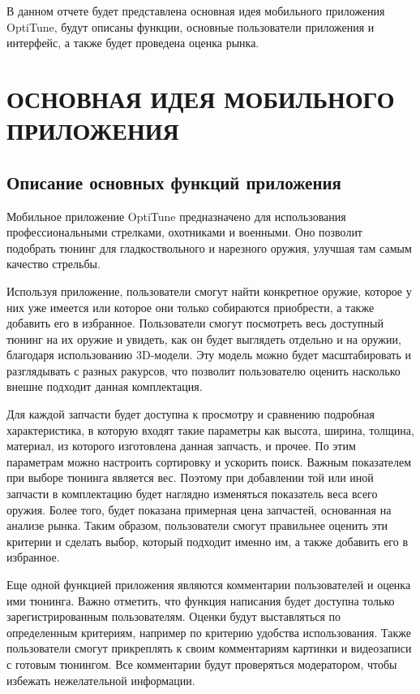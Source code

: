 \documentclass[14pt]{extreport}
\begin{document}
\pagestyle{empty} 


\pagestyle{plain}
\tableofcontents
 



\intro 

В данном отчете будет представлена основная идея мобильного приложения OptiTune, будут описаны функции, основные пользователи приложения и интерфейс, а также будет проведена оценка рынка.


\chapter{ОСНОВНАЯ ИДЕЯ МОБИЛЬНОГО ПРИЛОЖЕНИЯ\label{chapter1}}
\section{Описание основных функций приложения}

Мобильное приложение OptiTune предназначено для использования профессиональными стрелками, охотниками и военными. Оно позволит подобрать тюнинг для гладкоствольного и нарезного оружия, улучшая там самым качество стрельбы.

Используя приложение, пользователи смогут найти конкретное оружие, которое у них уже имеется или которое они только собираются приобрести, а также добавить его в избранное. Пользователи смогут посмотреть весь доступный тюнинг на их оружие и увидеть, как он будет выглядеть отдельно и на оружии, благодаря использованию 3D-модели. Эту модель можно будет масштабировать и разглядывать с разных ракурсов, что позволит пользователю оценить насколько внешне подходит данная комплектация.

Для каждой запчасти будет доступна к просмотру и сравнению подробная характеристика, в которую входят такие параметры как высота, ширина, толщина, материал, из которого изготовлена данная запчасть, и прочее. По этим параметрам можно настроить сортировку и ускорить поиск. Важным показателем при выборе тюнинга является вес. Поэтому при добавлении той или иной запчасти в комплектацию будет наглядно изменяться показатель веса всего оружия. Более того, будет показана примерная цена запчастей, основанная на анализе рынка. Таким образом, пользователи смогут правильнее оценить эти критерии и сделать выбор, который подходит именно им, а также добавить его в избранное.

Еще одной функцией приложения являются комментарии пользователей и оценка ими тюнинга. Важно отметить, что функция написания будет доступна только зарегистрированным пользователям. Оценки будут выставляться по определенным критериям, например по критерию удобства использования. Также пользователи смогут прикреплять к своим комментариям картинки и видеозаписи с готовым тюнингом. Все комментарии будут проверяться модератором, чтобы избежать нежелательной информации.
\end{document}
